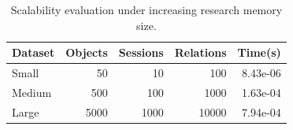 \begin{table}[t]
\caption{Scalability evaluation under increasing research memory size.}
\label{tab:scalability}
\centering
\begin{tabular}{lrrrr}
\hline
\textbf{Dataset} &
\textbf{Objects} &
\textbf{Sessions} &
\textbf{Relations} &
\textbf{Time(s)} \\
\hline

Small &
50 &
10 &
100 &
8.43e-06 \\

Medium &
500 &
100 &
1000 &
1.63e-04 \\

Large &
5000 &
1000 &
10000 &
7.94e-04 \\

\hline
\end{tabular}
\end{table}


